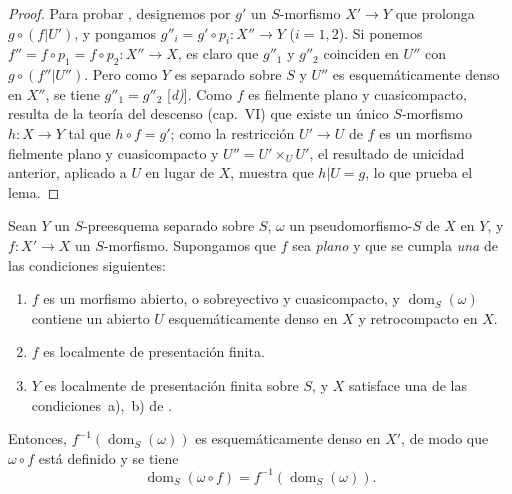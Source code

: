 \begin{proof}
Para probar , designemos por $g'$ un $S$-morfismo $X'\to Y$ que prolonga $g\circ(f|U')$, y pongamos $g''_i=g'\circ p_i:X''\to Y$ ($i=1,2$).
Si ponemos $f''=f\circ p_1=f\circ p_2:X''\to X$, es claro que $g''_1$ y $g''_2$ coinciden en $U''$ con $g\circ(f''|U'')$.
Pero como $Y$ es separado sobre $S$ y $U''$ es esquemáticamente denso en $X''$, se tiene $g''_1=g''_2$ [\emph{d)}].
Como $f$ es fielmente plano y cuasicompacto, resulta de la teoría del descenso (cap.~VI) que existe un único $S$-morfismo $h:X\to Y$ tal que $h\circ f=g'$; como la restricción $U'\to U$ de $f$ es un morfismo fielmente plano y cuasicompacto y $U''=U'\times_U U'$, el resultado de unicidad anterior, aplicado a $U$ en lugar de $X$, muestra que $h|U=g$, lo que prueba el lema.
\end{proof}

\begin{proposition}[20.3.11]
\label{IV.20.3.11}
Sean $Y$ un $S$-preesquema separado sobre $S$, $\omega$ un pseudomorfismo-$S$ de $X$ en $Y$, y $f:X'\to X$ un $S$-morfismo.
Supongamos que $f$ sea \emph{plano} y que se cumpla \emph{una} de las condiciones siguientes:
\begin{enumerate}[label=\emph{(\roman*)}]
  \item $f$ es un morfismo abierto, o sobreyectivo y cuasicompacto, y $\operatorname{dom}_S(\omega)$ contiene un abierto $U$ esquemáticamente denso en $X$ y retrocompacto en $X$.
  \item $f$ es localmente de presentación finita.
  \item $Y$ es localmente de presentación finita sobre $S$, y $X$ satisface una de las condiciones~\textup{a)},~\textup{b)} de .
\end{enumerate}
Entonces, $f^{-1}(\operatorname{dom}_S(\omega))$ es esquemáticamente denso en $X'$, de modo que $\omega\circ f$ está definido  y se tiene
\[
\label{IV.20.3.11.1}
  \operatorname{dom}_S(\omega\circ f)=f^{-1}(\operatorname{dom}_S(\omega)).
  \tag{20.3.11.1}
\]
\end{proposition}

